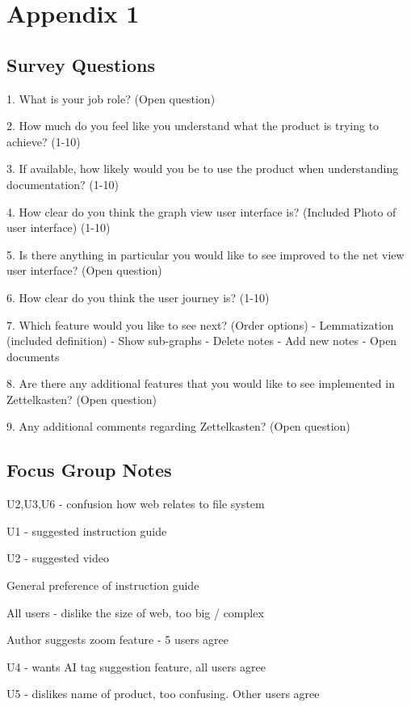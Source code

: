 \documentclass{article}
\begin{document}
\newpage
\section{Appendix 1}
{\parindent0pt
\subsection{Survey Questions}
1. What is your job role? (Open question)

2. How much do you feel like you understand what the product is trying to achieve? (1-10)

3. If available, how likely would you be to use the product when understanding documentation? (1-10)

4. How clear do you think the graph view user interface is? (Included Photo of user interface) (1-10)

5. Is there anything in particular you would like to see improved to the net view user interface? (Open question)

6. How clear do you think the user journey is? (1-10)

7. Which feature would you like to see next? (Order options)
- Lemmatization (included definition)
- Show sub-graphs
- Delete notes
- Add new notes
- Open documents

8. Are there any additional features that you would like to see implemented in Zettelkasten? (Open question)

9. Any additional comments regarding Zettelkasten? (Open question)

\subsection{Focus Group Notes}
U2,U3,U6 - confusion how web relates to file system

U1 - suggested instruction guide

U2 - suggested video

General preference of instruction guide

All users - dislike the size of web, too big / complex

Author suggests zoom feature - 5 users agree

U4 - wants AI tag suggestion feature, all users agree

U5 - dislikes name of product, too confusing. Other users agree
}
\end{document}
